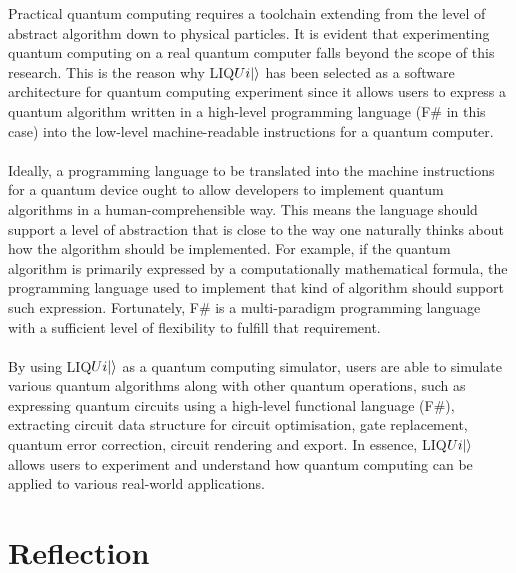 \documentclass[12pt]{third-rep}
\begin{document}
\noindent Practical quantum computing requires a toolchain extending from the level of abstract algorithm down to physical particles. It is evident that experimenting quantum computing on a real quantum computer falls beyond the scope of this research. This is the reason why LIQ$Ui{\left\vert{}\right\rangle}$ has been selected as a software architecture for quantum computing experiment since it allows users to express a quantum algorithm written in a high-level programming language (F\# in this case) into the low-level machine-readable instructions for a quantum computer. \\\\
Ideally, a programming language to be translated into the machine instructions for a quantum device ought to allow developers to implement quantum algorithms in a human-comprehensible way. This means the language should support a level of abstraction that is close to the way one naturally thinks about how the algorithm should be implemented. For example, if the quantum algorithm is primarily expressed by a computationally mathematical formula, the programming language used to implement that kind of algorithm should support such expression. Fortunately, F\# is a multi-paradigm programming language with a sufficient level of flexibility to fulfill that requirement. \\\\
By using LIQ$Ui{\left\vert{}\right\rangle}$ as a quantum computing simulator, users are able to simulate various quantum algorithms along with other quantum operations, such as expressing quantum circuits using a high-level functional language (F\#), extracting circuit data structure for circuit optimisation, gate replacement, quantum error correction, circuit rendering and export. In essence, LIQ$Ui{\left\vert{}\right\rangle}$ allows users to experiment and understand how quantum computing can be applied to various real-world applications.

\begingroup
\renewcommand{\cleardoublepage}{}
\renewcommand{\clearpage}{}
\chapter{Reflection}
\endgroup
\end{document}
